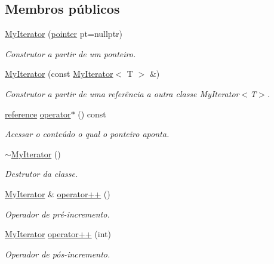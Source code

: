\subsection*{Membros públicos}
\begin{DoxyCompactItemize}
\item 
\hyperlink{classsc_1_1MyIterator_a4ebed96cc5759db0edaeafc39910af27}{My\+Iterator} (\hyperlink{classsc_1_1MyIterator_aac55734d4d00af05ed90556dd8f8df0b}{pointer} pt=nullptr)
\begin{DoxyCompactList}\small\item\em Construtor a partir de um ponteiro. \end{DoxyCompactList}\item 
\hyperlink{classsc_1_1MyIterator_aaa0e08bed1cb4a30d52790ef48ef75cf}{My\+Iterator} (const \hyperlink{classsc_1_1MyIterator}{My\+Iterator}$<$ T $>$ \&)
\begin{DoxyCompactList}\small\item\em Construtor a partir de uma referência a outra classe My\+Iterator$<$\+T$>$. \end{DoxyCompactList}\item 
\hyperlink{classsc_1_1MyIterator_a713949524e31c23eade8ea3521c938ef}{reference} \hyperlink{classsc_1_1MyIterator_ae655a959eee3b7ed2bc9a897c537810a}{operator$\ast$} () const
\begin{DoxyCompactList}\small\item\em Acessar o conteúdo o qual o ponteiro aponta. \end{DoxyCompactList}\item 
\hyperlink{classsc_1_1MyIterator_ae61c838df11b715349ffd198bc85e50f}{$\sim$\+My\+Iterator} ()
\begin{DoxyCompactList}\small\item\em Destrutor da classe. \end{DoxyCompactList}\item 
\hyperlink{classsc_1_1MyIterator}{My\+Iterator} \& \hyperlink{classsc_1_1MyIterator_ae02016f0e3a1263ba48a4efe752ba966}{operator++} ()
\begin{DoxyCompactList}\small\item\em Operador de pré-\/incremento. \end{DoxyCompactList}\item 
\hyperlink{classsc_1_1MyIterator}{My\+Iterator} \hyperlink{classsc_1_1MyIterator_a8643ca063ca14a2ed88a56f77b3033aa}{operator++} (int)
\begin{DoxyCompactList}\small\item\em Operador de pós-\/incremento. \end{DoxyCompactList}\item 

\end{DoxyCompactItemize}
